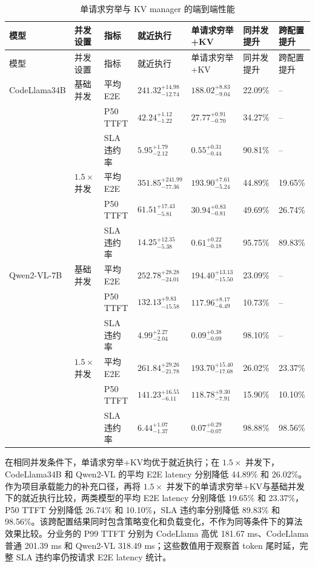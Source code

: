 \begingroup
\scriptsize
\setlength{\tabcolsep}{2pt}
\begin{longtable}{p{}p{}>{\raggedright\arraybackslash}p{}p{}p{}p{}p{}}
\caption{单请求穷举与 KV manager 的端到端性能}
\label{tab:offloading-preliminary-results}\\
\toprule
模型 & 并发设置 & 指标 & 就近执行 & 单请求穷举+KV & 同并发提升 & 跨配置提升 \\
\midrule
\endfirsthead
\toprule
模型 & 并发设置 & 指标 & 就近执行 & 单请求穷举+KV & 同并发提升 & 跨配置提升 \\
\midrule
\endhead
CodeLlama34B
& 基础并发 & 平均 E2E & \(241.32_{-12.74}^{+14.98}\) & \(188.02_{-9.04}^{+8.83}\) & 22.09\% & -- \\
& & P50 TTFT & \(42.24_{-1.22}^{+1.12}\) & \(27.77_{-0.70}^{+0.91}\) & 34.27\% & -- \\
& & SLA 违约率 & \(5.95_{-2.12}^{+1.79}\) & \(0.55_{-0.44}^{+0.31}\) & 90.81\% & -- \\
& \(1.5\times\) 并发 & 平均 E2E & \(351.85_{-77.36}^{+241.99}\) & \(193.90_{-5.24}^{+7.61}\) & 44.89\% & 19.65\% \\
& & P50 TTFT & \(61.51_{-5.81}^{+17.43}\) & \(30.94_{-0.81}^{+0.83}\) & 49.69\% & 26.74\% \\
& & SLA 违约率 & \(14.25_{-5.38}^{+12.35}\) & \(0.61_{-0.18}^{+0.22}\) & 95.75\% & 89.83\% \\
\midrule
Qwen2-VL-7B
& 基础并发 & 平均 E2E & \(252.78_{-24.01}^{+28.28}\) & \(194.40_{-15.50}^{+13.13}\) & 23.09\% & -- \\
& & P50 TTFT & \(132.13_{-15.58}^{+9.83}\) & \(117.96_{-6.49}^{+8.17}\) & 10.73\% & -- \\
& & SLA 违约率 & \(4.99_{-2.04}^{+2.27}\) & \(0.09_{-0.09}^{+0.38}\) & 98.10\% & -- \\
& \(1.5\times\) 并发 & 平均 E2E & \(261.84_{-21.78}^{+29.26}\) & \(193.70_{-17.68}^{+15.40}\) & 26.02\% & 23.37\% \\
& & P50 TTFT & \(141.23_{-6.11}^{+16.55}\) & \(118.78_{-7.91}^{+9.30}\) & 15.90\% & 10.10\% \\
& & SLA 违约率 & \(6.44_{-1.37}^{+1.07}\) & \(0.07_{-0.07}^{+0.29}\) & 98.88\% & 98.56\% \\
\bottomrule
\end{longtable}
\endgroup

在相同并发条件下，单请求穷举+KV均优于就近执行；在 \(1.5\times\) 并发下，CodeLlama34B 和 Qwen2-VL 的平均 E2E latency 分别降低 44.89\% 和 26.02\%。作为项目承载能力的补充口径，再将 \(1.5\times\) 并发下的单请求穷举+KV与基础并发下的就近执行比较，两类模型的平均 E2E latency 分别降低 19.65\% 和 23.37\%，P50 TTFT 分别降低 26.74\% 和 10.10\%，SLA 违约率分别降低 89.83\% 和 98.56\%。该跨配置结果同时包含策略变化和负载变化，不作为同等条件下的算法效果比较。分业务的 P99 TTFT 分别为 CodeLlama 高优 181.67 ms、CodeLlama 普通 201.39 ms 和 Qwen2-VL 318.49 ms；这些数值用于观察首 token 尾时延，完整 SLA 违约率仍按请求 E2E latency 统计。

